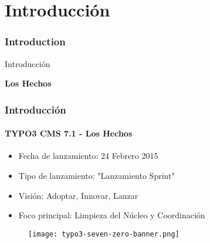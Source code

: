 %

\section{Introducción}
\begin{frame}[fragile]
	\frametitle{Introduction}

	\begin{center}\huge{Introducción}\end{center}
	\begin{center}\huge{\color{typo3darkgrey}\textbf{Los Hechos}}\end{center}

\end{frame}


\begin{frame}[fragile]
	\frametitle{Introducción}
	\framesubtitle{TYPO3 CMS 7.1 - Los Hechos}

	\begin{itemize}
		\item Fecha de lanzamiento: 24 Febrero 2015
		\item Tipo de lanzamiento: "Lanzamiento Sprint"
		\item Visión: Adoptar, Innovar, Lanzar
		\item Foco principal: Limpieza del Núcleo y Coordinación
	\end{itemize}

	\begin{figure}
		\texttt{[image: typo3-seven-zero-banner.png]}
	\end{figure}

\end{frame}

